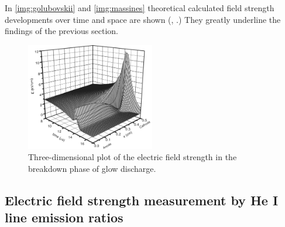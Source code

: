 \documentclass[a4paper,10pt,twoside]{article}
\begin{document}
		In \autoref{img:golubovskii} and \autoref{img:massines} theoretical calculated field strength developments over time and space are shown (\cite{Massines}, \cite{0022-3727-36-1-306}.) They greatly underline the findings of the previous section.
		
			\begin{figure}
				\centering
				\includegraphics[width=0.5\textwidth]{figures/706nm@square/golubovskiip47fig9}
				\caption{Three-dimensional plot of the electric field strength in the breakdown phase of glow discharge. \cite{0022-3727-36-1-306}}
				\label{img:golubovskii}
			\end{figure}
		

		\subsection{Electric field strength measurement by He I line emission ratios}
		
			\onecolumn
			
\end{document}
